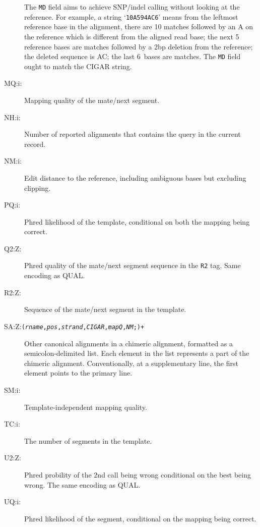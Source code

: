 \documentclass[10pt]{article}
\newcommand{\tagvalue}[1]{\tt #1}
\newcommand{\tagregex}[1]{\tt #1}
\begin{document}
\begin{description}
The {\tt MD} field aims to achieve SNP/indel calling without
looking at the reference. For example, a string `{\tt 10A5\char94AC6}' means
from the leftmost reference base in the alignment, there are 10 matches
followed by an A on the reference which is different from the aligned read
base; the next 5 reference bases are matches followed by a 2bp deletion from
the reference; the deleted sequence is AC; the last 6~bases are matches.
The {\tt MD} field ought to match the {\sf CIGAR} string.

\item[MQ:i:\tagvalue{}]
Mapping quality of the mate/next segment.

\item[NH:i:\tagvalue{}]
Number of reported alignments that contains the query in the current record.

\item[NM:i:\tagvalue{}]
Edit distance to the reference, including ambiguous bases but excluding clipping.

\item[PQ:i:\tagvalue{}]
Phred likelihood of the template, conditional on both the mapping being correct.

\item[Q2:Z:\tagvalue{}]
Phred quality of the mate/next segment sequence in the {\tt R2} tag.
Same encoding as {\sf QUAL}.

\item[R2:Z:\tagvalue{}]
Sequence of the mate/next segment in the template.

\item[SA:Z:\tagregex{{\tt (}\emph{rname}{\tt ,}\emph{pos}{\tt ,}\emph{strand}{\tt ,}\emph{CIGAR}{\tt ,}\emph{mapQ}{\tt ,}\emph{NM}{\tt ;)}+}]
Other canonical alignments in a chimeric alignment, formatted as a semicolon-delimited list.
Each element in the list represents a part of the chimeric alignment. Conventionally, at a supplementary line, the first element points to the primary line.

\item[SM:i:\tagvalue{}]
Template-independent mapping quality.

\item[TC:i:\tagvalue{}]
The number of segments in the template.

\item[U2:Z:\tagvalue{}]
Phred probility of the 2nd call being wrong conditional on the best being wrong.
The same encoding as {\sf QUAL}.

\item[UQ:i:\tagvalue{}]
Phred likelihood of the segment, conditional on the mapping being correct.
\end{description}
\end{document}
